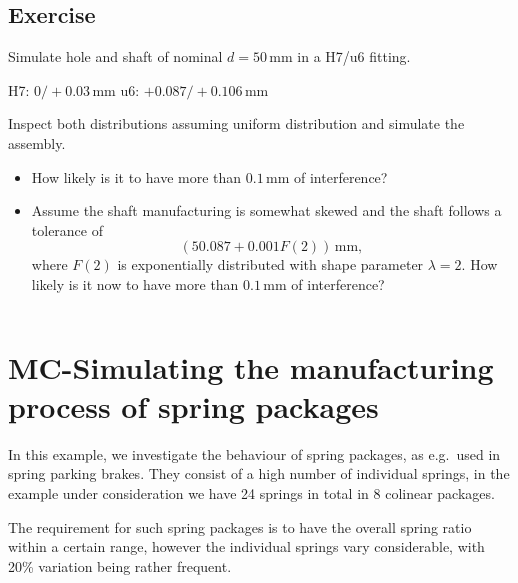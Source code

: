 \documentclass[11pt,a4paper, d]{scrartcl}
\makeatletter
\providecommand{\tightlist}{%
      \setlength{\itemsep}{0pt}\setlength{\parskip}{0pt}}
\newcommand{\boxspacing}{\kern\kvtcb@left@rule\kern\kvtcb@boxsep}
\newcommand{\prompt}[4]{
        {\ttfamily\llap{{\color{#2}[#3]:\hspace{3pt}#4}}\vspace{-\baselineskip}}
    }
\makeatother
\begin{document}
    \hypertarget{exercise}{%
\subsection{Exercise}\label{exercise}}

Simulate hole and shaft of nominal \(d = 50\,\mathrm{mm}\) in a H7/u6
fitting.

H7: \(0/+0.03\,\mathrm{mm}\) u6: \(+0.087/+0.106\,\mathrm{mm}\)

Inspect both distributions assuming uniform distribution and simulate
the assembly.

\begin{itemize}
\tightlist
\item
  How likely is it to have more than \(0.1\,\mathrm{mm}\) of
  interference?
\item
  Assume the shaft manufacturing is somewhat skewed and the shaft
  follows a tolerance of \[(50.087+0.001 F(2))\,\mathrm{mm},\] where
  \(F(2)\) is exponentially distributed with shape parameter
  \(\lambda = 2\). How likely is it now to have more than
  \(0.1\,\mathrm{mm}\) of interference?
\end{itemize}

    \begin{tcolorbox}[breakable, size=fbox, boxrule=1pt, pad at break*=1mm,colback=cellbackground, colframe=cellborder]
\prompt{In}{incolor}{ }{\boxspacing}
\begin{Verbatim}[commandchars=\\\{\}]

\end{Verbatim}
\end{tcolorbox}

    \hypertarget{mc-simulating-the-manufacturing-process-of-spring-packages}{%
\section{MC-Simulating the manufacturing process of spring
packages}\label{mc-simulating-the-manufacturing-process-of-spring-packages}}

In this example, we investigate the behaviour of spring packages, as
e.g.~used in spring parking brakes. They consist of a high number of
individual springs, in the example under consideration we have 24
springs in total in 8 colinear packages.

The requirement for such spring packages is to have the overall spring
ratio within a certain range, however the individual springs vary
considerable, with 20\% variation being rather frequent.
\end{document}
